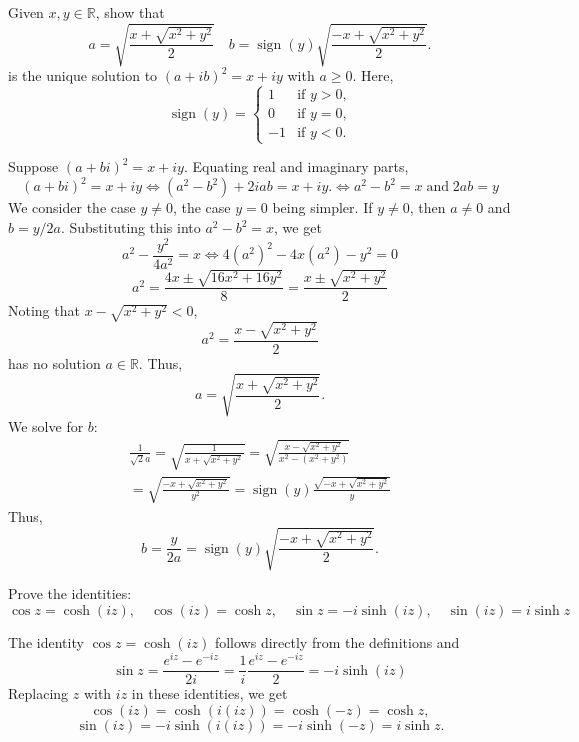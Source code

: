 \documentclass[12pt, answers]{exam}
\newcommand{\RR}{\mathbb{R}}
\DeclareMathOperator{\sign}{sign}
\begin{document}
\begin{questions}
    \question\label{Q:sqrt}
    Given $x,y\in\RR$, show that 
    \begin{equation*}
        a=\sqrt{\frac{x+\sqrt{x^2+y^2}}2}\quad
        b=\sign(y)\sqrt{\frac{-x+\sqrt{x^2+y^2}}2}.
    \end{equation*}
    is the unique solution to $(a+ib)^2=x+iy$ with $a\geq 0$. Here,
    \[
        \sign(y)=\begin{cases}
            1&\text{if $y>0$,}\\0&\text{if $y=0$,}\\-1&\text{if $y<0$.}
        \end{cases}
    \]
    \begin{solution}
        Suppose $(a+bi)^2 = x+iy$. Equating real and imaginary parts,
        \[
            (a+bi)^2 = x+iy\Longleftrightarrow (a^2-b^2) + 2iab = x + iy.
            \Longleftrightarrow a^2-b^2=x\;\text{and}\;2ab=y
        \]
        We consider the case $y\neq 0$, the case $y=0$ being simpler. If $y\neq 0$, then $a\neq 0$ and $b=y/2a$. Substituting this into $a^2-b^2=x$, we get
        \[
            a^2 - \frac{y^2}{4a^2} = x\Longleftrightarrow 4(a^2)^2 - 4x(a^2) - y^2=0
        \]
        \[
            a^2 = \frac{4x\pm \sqrt{16x^2 + 16y^2}}{8} = \frac{x\pm \sqrt{x^2 + y^2}}{2}
        \]
        Noting that $x-\sqrt{x^2+y^2}<0$,
        \[
            a^2=\frac{x-\sqrt{x^2+y^2}}2
        \]
        has no solution $a\in\RR$. Thus,
        \[
            a = \sqrt{\frac{x+\sqrt{x^2+y^2}}2}.
        \]
        We solve for $b$:
        \begin{multline*}
            \frac1{\sqrt2a} = \sqrt{\frac1{x+\sqrt{x^2+y^2}}} = \sqrt{\frac{x - \sqrt{x^2+y^2}}{x^2 - (x^2+y^2)}}\\ = \sqrt{\frac{-x+\sqrt{x^2+y^2}}{y^2}}
            =\sign(y)\frac{\sqrt{-x+\sqrt{x^2+y^2}}}{y}
        \end{multline*}
        Thus,
        \[
    b = \frac{y}{2a} = \sign(y)\sqrt{\frac{-x+\sqrt{x^2+y^2}}{2}}.
        \]
    \end{solution}



    \question Prove the identities:
    \[
        \cos z = \cosh(iz),\quad \cos(iz) = \cosh z,\quad
        \sin z = -i\sinh(iz),\quad \sin(iz) = i\sinh z
    \]
    \begin{solution}
        The identity $\cos z=\cosh(iz)$ follows directly from the definitions and
        \[
            \sin z = \frac{e^{iz} - e^{-iz}}{2i} = \frac1i\frac{e^{iz} - e^{-iz}}{2} = -i\sinh(iz)
        \]
        Replacing $z$ with $iz$ in these identities, we get
        \[
            \cos(iz) = \cosh(i(iz)) = \cosh(-z) = \cosh z,
        \]
        \[
            \sin(iz) = -i\sinh(i(iz)) = -i\sinh(-z) = i\sinh z.
        \]
    \end{solution}




\end{questions}
\end{document}
